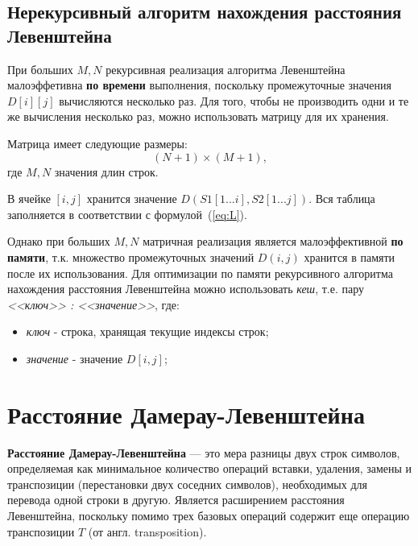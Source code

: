 \subsection{Нерекурсивный алгоритм нахождения расстояния Левенштейна}

При больших $M, N$ рекурсивная реализация алгоритма Левенштейна малоэффетивна \textbf{по времени} выполнения, поскольку промежуточные значения $D[i][j]$ вычисляются несколько раз. Для того, чтобы не производить одни и те же вычисления несколько раз, можно использовать матрицу для их хранения.

Матрица имеет следующие размеры:
\begin{equation}
	\label{eq:lev-m-size}
	(N + 1) \times (M + 1),
\end{equation}
где $M, N$ значения длин строк.

В ячейке $[i, j]$ хранится значение $D(S1[1...i], S2[1...j])$. Вся таблица заполняется в соответствии с формулой~(\ref{eq:L}). 

Однако при больших $M, N$ матричная реализация является малоэффективной \textbf{по памяти}, т.к. множество промежуточных значений $D(i,j)$ хранится в памяти после их использования. Для оптимизации по памяти рекурсивного алгоритма нахождения расстояния Левенштейна можно использовать \textit{кеш}, т.е. пару \textit{<<ключ>> : <<значение>>}, где:
\begin{itemize}
    \item \textit{ключ} - строка, хранящая текущие индексы строк;
    \item \textit{значение} - значение $D[i, j]$;
\end{itemize}

\section{Расстояние Дамерау-Левенштейна}
\textbf{Расстояние Дамерау-Левенштейна} --- это мера разницы двух строк символов, определяемая как минимальное количество операций вставки, удаления, замены и транспозиции (перестановки двух соседних символов), необходимых для перевода одной строки в другую. Является расширением расстояния Левенштейна, поскольку помимо трех базовых операций содержит еще операцию транспозиции $T$ (от англ. transposition).


